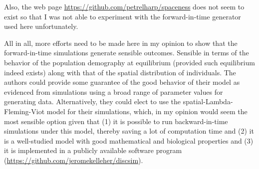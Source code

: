 
\begin{point}{}
    Also, the web page \url{https://github.com/petrelharp/spaceness} does not seem to exist so that I was not able to experiment with the forward-in-time generator used here unfortunately.
\end{point}


\begin{point}{}
    All in all, more efforts need to be made here in my opinion to show that the forward-in-time simulations generate sensible outcomes. Sensible in terms of the behavior of the population demography at equilibrium (provided such equilibrium indeed exists) along with that of the spatial distribution of individuals. The authors could provide some guarantee of the good behavior of their model as evidenced from simulations using a broad range of parameter values for generating data. Alternatively, they could elect to use the spatial-Lambda-Fleming-Viot model for their simulations, which, in my opinion would seem the most sensible option given that (1) it is possible to run backward-in-time simulations under this model, thereby saving a lot of computation time and (2) it is a well-studied model with good mathematical and biological properties and (3) it is implemented in a publicly available software program (\url{https://github.com/jeromekelleher/discsim}).
\end{point}


